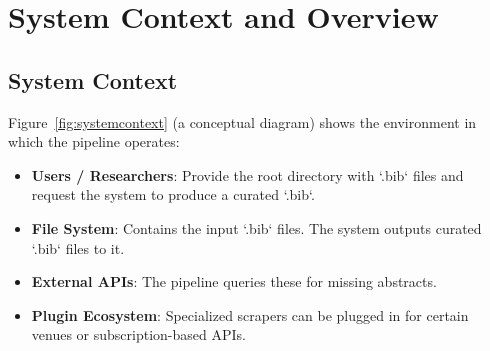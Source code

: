 \documentclass[12pt]{article}
\begin{document}
\section{System Context and Overview}

\subsection{System Context}
Figure~\ref{fig:systemcontext} (a conceptual diagram) shows the environment in which the pipeline operates:

\begin{itemize}
  \item \textbf{Users / Researchers}: Provide the root directory with `.bib` files and request the system to produce a curated `.bib`.
  \item \textbf{File System}: Contains the input `.bib` files. The system outputs curated `.bib` files to it.
  \item \textbf{External APIs}: The pipeline queries these for missing abstracts. 
  \item \textbf{Plugin Ecosystem}: Specialized scrapers can be plugged in for certain venues or subscription-based APIs.
\end{itemize}

\begin{center}
\label{fig:systemcontext}
\end{center}
\end{document}
